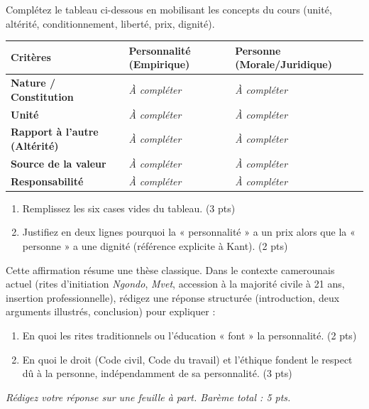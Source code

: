 \documentclass[11pt]{article}
\begin{document}
\begin{exercice}
Complétez le tableau ci-dessous en mobilisant les concepts du cours (unité, altérité, conditionnement, liberté, prix, dignité).
\begin{center}
\begin{tabularx}{\linewidth}{|>{\bfseries}X|X|X|}
\hline
\textbf{Critères} & \textbf{Personnalité (Empirique)} & \textbf{Personne (Morale/Juridique)} \\ \hline
Nature / Constitution & \textit{À compléter} & \textit{À compléter} \\ \hline
Unité & \textit{À compléter} & \textit{À compléter} \\ \hline
Rapport à l'autre (Altérité) & \textit{À compléter} & \textit{À compléter} \\ \hline
Source de la valeur & \textit{À compléter} & \textit{À compléter} \\ \hline
Responsabilité & \textit{À compléter} & \textit{À compléter} \\ \hline
\end{tabularx}
\end{center}
\begin{enumerate}
    \item Remplissez les six cases vides du tableau. (3 pts)
    \item Justifiez en deux lignes pourquoi la « personnalité » a un prix alors que la « personne » a une dignité (référence explicite à Kant). (2 pts)
\end{enumerate}
\end{exercice}

\begin{exercice}
Cette affirmation résume une thèse classique. Dans le contexte camerounais actuel (rites d'initiation \textit{Ngondo}, \textit{Mvet}, accession à la majorité civile à 21 ans, insertion professionnelle), rédigez une réponse structurée (introduction, deux arguments illustrés, conclusion) pour expliquer :
\begin{enumerate}
    \item En quoi les rites traditionnels ou l'éducation « font » la personnalité. (2 pts)
    \item En quoi le droit (Code civil, Code du travail) et l'éthique fondent le respect dû à la personne, indépendamment de sa personnalité. (3 pts)
\end{enumerate}
\textit{Rédigez votre réponse sur une feuille à part. Barème total : 5 pts.}
\end{exercice}
\end{document}
